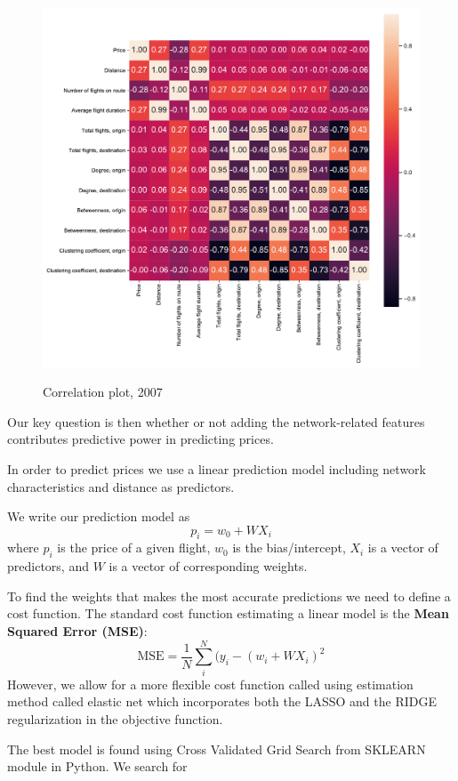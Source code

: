 \begin{figure}[H]
  \centering
  \caption{Correlation plot, 2007}
    \includegraphics[width=1. \textwidth]{Exam/Figures/corr_plot.pdf}
  \label{fig:map_general}
\end{figure}
Our key question is then whether or not adding the network-related features contributes predictive power in predicting prices. 

In order to predict prices we use a linear prediction model including network characteristics and distance as predictors.

We write our prediction model as
$$
p_i = w_0 + W X_i 
$$
where $p_i$ is the price of a given flight, $w_0$ is the bias/intercept, $X_i$ is a vector of predictors, and $W$ is a vector of corresponding weights. 

To find the weights that makes the most accurate predictions we need to define a cost function. The standard cost function estimating a linear model is the \textbf{Mean Squared Error (MSE)}:
$$
\text{MSE}=\frac{1}{N} \sum_i^N (y_i - (w_i + WX_i)^2
$$
However, we allow for a more flexible cost function called using estimation method called elastic net which incorporates both the LASSO and the RIDGE regularization in the objective function. 

The best model is found using Cross Validated Grid Search from SKLEARN module in Python. We search for 
